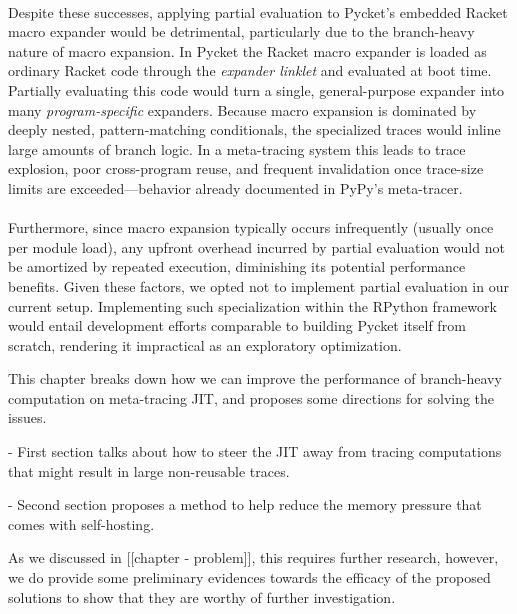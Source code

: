     \paragraph{}%
      Despite these successes, applying partial evaluation to Pycket's embedded Racket macro expander would be detrimental, particularly due to the branch-heavy nature of macro expansion. In Pycket the Racket macro expander is loaded as ordinary Racket code through the \textit{expander linklet} and evaluated at boot time. Partially evaluating this code would turn a single, general-purpose expander into many \emph{program-specific} expanders. Because macro expansion is dominated by deeply nested, pattern-matching conditionals, the specialized traces would inline large amounts of branch logic. In a meta-tracing system this leads to trace explosion, poor cross-program reuse, and frequent invalidation once trace-size limits are exceeded—behavior already documented in PyPy’s meta-tracer.

    \paragraph{}%
      Furthermore, since macro expansion typically occurs infrequently (usually once per module load), any upfront overhead incurred by partial evaluation would not be amortized by repeated execution, diminishing its potential performance benefits. Given these factors, we opted not to implement partial evaluation in our current setup. Implementing such specialization within the RPython framework would entail development efforts comparable to building Pycket itself from scratch, rendering it impractical as an exploratory optimization.

    \begin{paragraph-here}
      This chapter breaks down how we can improve the performance of branch-heavy computation on meta-tracing JIT, and proposes some directions for solving the issues.

        - First section talks about how to steer the JIT away from tracing computations that might result in large non-reusable traces.

        - Second section proposes a method to help reduce the memory pressure that comes with self-hosting.

      As we discussed in [[chapter - problem]], this requires further research, however, we do provide some preliminary evidences towards the efficacy of the proposed solutions to show that they are worthy of further investigation.
    \end{paragraph-here}



